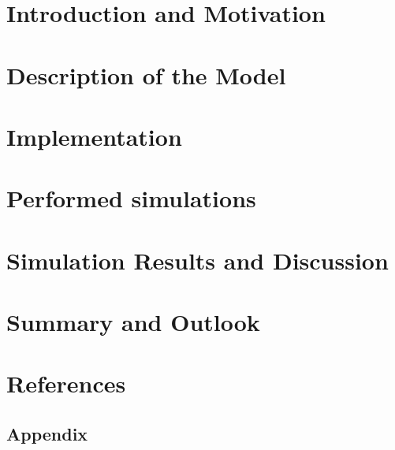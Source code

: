 \documentclass[11pt]{article}
\begin{document}
\section{Introduction and Motivation}

\newpage

\section{Description of the Model}

\newpage

\section{Implementation}

\newpage

\section{Performed simulations}

\newpage

\section{Simulation Results and Discussion}

\newpage

\section{Summary and Outlook}

\newpage

\section{References}


\newpage


\newpage
\begin{appendix}
\section{Appendix}

\clearpage

\end{appendix}


\end{document}
